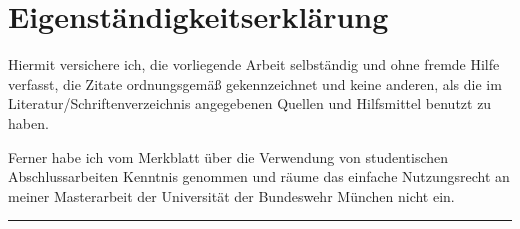 \chapter{Eigenständigkeitserklärung}

Hiermit versichere ich, die vorliegende Arbeit selbständig und ohne fremde Hilfe verfasst, die Zitate ordnungsgemäß gekennzeichnet und keine anderen, als die im Literatur/Schriftenverzeichnis angegebenen Quellen und Hilfsmittel benutzt zu haben. 

Ferner habe ich vom Merkblatt über die Verwendung von studentischen Abschlussarbeiten Kenntnis genommen und räume das einfache Nutzungsrecht an meiner Masterarbeit der Universität der Bundeswehr München nicht ein.

\addvspace{15mm}

\hfill \rule{80mm}{0.4pt}

\hfill \VARname